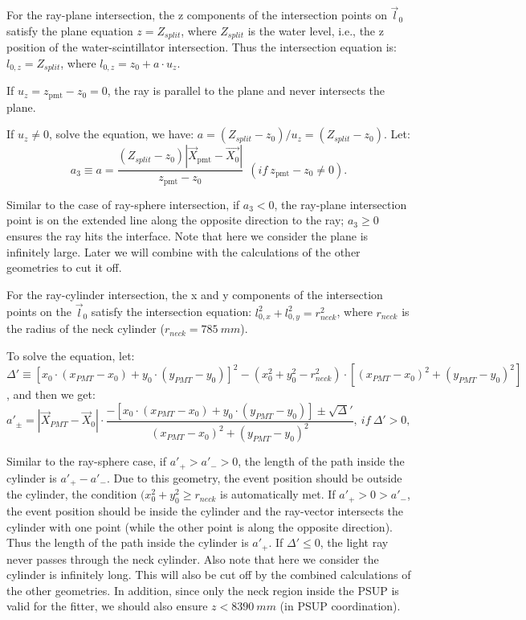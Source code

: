 For the ray-plane intersection, the z components of the intersection points on $\vec{l}_0$ satisfy the plane equation $z=Z_{split}$, where $Z_{split}$ is the water level, i.e., the z position of the water-scintillator intersection. Thus the intersection equation is:
$l_{0,z}=Z_{split}$, where $l_{0,z}=z_0+a\cdot u_z$.

If $u_z=z_\mathrm{pmt}-z_0=0$, the ray is parallel to the plane and never intersects the plane.

If $u_z\neq 0$, solve the equation, we have: $a=(Z_{split}-z_0)/u_z=(Z_{split}-z_0)$.
Let: 
\[
a_3 \equiv a = \frac{(Z_{split}-z_0)|\vec{X}_{\mathrm{pmt}}-\vec{X_0}|}{z_\mathrm{pmt}-z_0}~~(if ~z_\mathrm{pmt}-z_0\neq 0).
\]

Similar to the case of ray-sphere intersection, if $a_3<0$, the ray-plane intersection point is on the extended line along the opposite direction to the ray; $a_3 \geq 0$ ensures the ray hits the interface. Note that here we consider the plane is infinitely large. Later we will combine with the calculations of the other geometries to cut it off. 

For the ray-cylinder intersection, the x and y components of the intersection points on the $\vec l_0$ satisfy the intersection equation: $l^2_{0,x}+l^2_{0,y} = r^2_{neck}$, where $r_{neck}$ is the radius of the neck cylinder ($r_{neck}=785~mm$).

To solve the equation,  let: $\Delta'\equiv [x_0\cdot (x_{PMT}-x_0)+y_0\cdot(y_{PMT}-y_0)]^2 - ( x_0^2+y_0^2-r^2_{neck})\cdot [(x_{PMT}-x_0)^2+(y_{PMT}-y_0)^2]$, and then we get: 
\begin{equation}\label{eq:ray-cylinder}
a'_{\pm} = |\vec{X}_{PMT}-\vec{X}_0|\cdot\frac{-[x_0\cdot (x_{PMT}-x_0)+y_0\cdot(y_{PMT}-y_0)] \pm \sqrt\Delta' }{(x_{PMT}-x_0)^2+(y_{PMT}-y_0)^2},~if~\Delta'>0,
\end{equation}

Similar to the ray-sphere case, if $a'_{+}>a'_->0$, the length of the path inside the cylinder is $a'_+-a'_-$. Due to this geometry, the event position should be outside the cylinder, the condition $(x^2_0+y^2_0\geq r_{neck}$ is automatically met. If $a'_+>0>a'_-$, the event position should be inside the cylinder and the ray-vector intersects the cylinder with one point (while the other point is along the opposite direction). Thus the length of the path inside the cylinder is $a'_+$. If $\Delta'\leq0$, the light ray never passes through the neck cylinder. Also note that here we consider the cylinder is infinitely long. This will also be cut off by the combined calculations of the other geometries. In addition, since only the neck region inside the PSUP is valid for the fitter, we should also ensure $z<8390~mm$ (in PSUP coordination).

